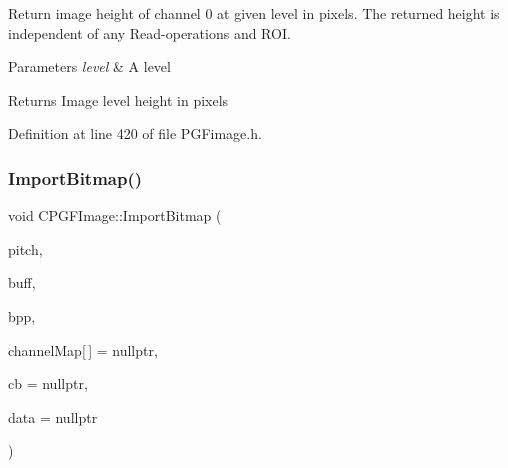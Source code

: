 Return image height of channel 0 at given level in pixels. The returned height is independent of any Read-\/operations and R\+OI. 
\begin{DoxyParams}{Parameters}
{\em level} & A level \\
\hline
\end{DoxyParams}
\begin{DoxyReturn}{Returns}
Image level height in pixels 
\end{DoxyReturn}


Definition at line 420 of file P\+G\+Fimage.\+h.


\begin{DoxyCode}{0}

\end{DoxyCode}
\mbox{\label{classCPGFImage_a3c0895f4738c5222de1920c941a71541}} 
\subsubsection{\texorpdfstring{ImportBitmap()}{ImportBitmap()}}
{\footnotesize\ttfamily void C\+P\+G\+F\+Image\+::\+Import\+Bitmap (\begin{DoxyParamCaption}\item[{int}]{pitch,  }\item[{U\+I\+N\+T8 $\ast$}]{buff,  }\item[{B\+Y\+TE}]{bpp,  }\item[{int}]{channel\+Map\mbox{[}$\,$\mbox{]} = {\ttfamily nullptr},  }\item[{Callback\+Ptr}]{cb = {\ttfamily nullptr},  }\item[{void $\ast$}]{data = {\ttfamily nullptr} }\end{DoxyParamCaption})}

